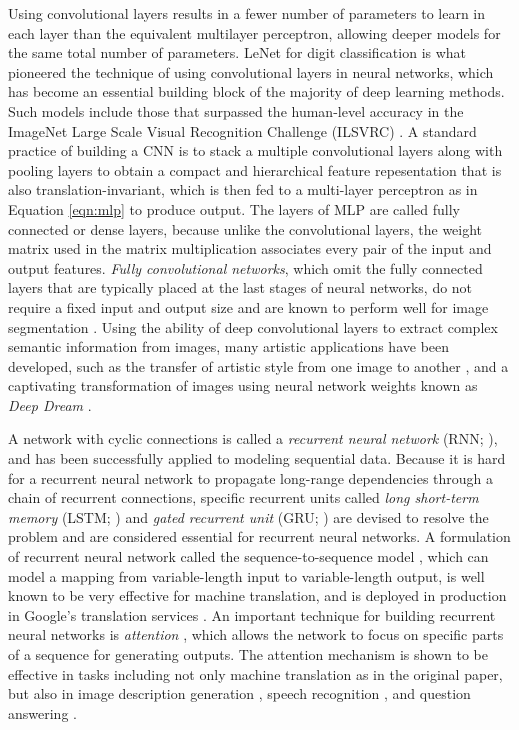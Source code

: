 Using convolutional layers results in a fewer number of parameters to learn in each layer than the equivalent multilayer perceptron, allowing deeper models for the same total number of parameters.
LeNet \cite{lecun1995lenet} for digit classification is what pioneered the technique of using convolutional layers in neural networks, which has become an essential building block of the majority of deep learning methods.
Such models include those that surpassed the human-level accuracy in the ImageNet Large Scale Visual Recognition Challenge (ILSVRC) \cite{krizhevsky2012imagenet, simonyan2014vgg, szegedy2015googlenet, he2016resnet}.
A standard practice of building a CNN is to stack a multiple convolutional layers along with pooling layers to obtain a compact and hierarchical feature repesentation that is also translation-invariant, which is then fed to a multi-layer perceptron as in Equation \ref{eqn:mlp} to produce output.
The layers of MLP are called fully connected or dense layers, because unlike the convolutional layers, the weight matrix used in the matrix multiplication associates every pair of the input and output features.
\emph{Fully convolutional networks}, which omit the fully connected layers that are typically placed at the last stages of neural networks, do not require a fixed input and output size and are known to perform well for image segmentation \cite{shelhamer2017fcn}.
Using the ability of deep convolutional layers to extract complex semantic information from images, many artistic applications have been developed, such as the transfer of artistic style from one image to another \cite{gatys2015style}, and a captivating transformation of images using neural network weights known as \emph{Deep Dream} \cite{mahendran2016deepdream}.


A network with cyclic connections is called a \emph{recurrent neural network} (RNN; ), and has been successfully applied to modeling sequential data.
Because it is hard for a recurrent neural network to propagate long-range dependencies through a chain of recurrent connections, specific recurrent units called \emph{long short-term memory} (LSTM; ) and \emph{gated recurrent unit} (GRU; ) are devised to resolve the problem and are considered essential for recurrent neural networks.
A formulation of recurrent neural network called the sequence-to-sequence model \cite{cho2014seq2seq,sutskever2014seq2seq}, which can model a mapping from variable-length input to variable-length output, is well known to be very effective for machine translation, and is deployed in production in Google's translation services \cite{wu2016google}.
An important technique for building recurrent neural networks is \emph{attention} \cite{bahdanau2014attention}, which allows the network to focus on specific parts of a sequence for generating outputs.
The attention mechanism is shown to be effective in tasks including not only machine translation as in the original paper, but also in image description generation \cite{karpathy2017desc}, speech recognition \cite{chorowski2015speech}, and question answering \cite{sukhbaatar2015memory}.

